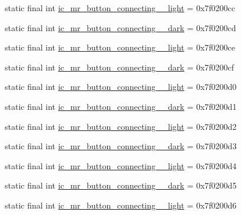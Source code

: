 \begin{CompactItemize}
\item 
static final int \hyperlink{classandroid_1_1support_1_1graphics_1_1drawable_1_1animated_1_1_r_1_1drawable_4007dc5f6162a5acce25eed9bab233d5}{ic\_\-mr\_\-button\_\-connecting\_\_\-light} = 0x7f0200cc
\item 
static final int \hyperlink{classandroid_1_1support_1_1graphics_1_1drawable_1_1animated_1_1_r_1_1drawable_16026dc935c996a94e7cd1c3d186f9f5}{ic\_\-mr\_\-button\_\-connecting\_\_\-dark} = 0x7f0200cd
\item 
static final int \hyperlink{classandroid_1_1support_1_1graphics_1_1drawable_1_1animated_1_1_r_1_1drawable_51d6776d69bb6c65dd52cec5afc11d7f}{ic\_\-mr\_\-button\_\-connecting\_\_\-light} = 0x7f0200ce
\item 
static final int \hyperlink{classandroid_1_1support_1_1graphics_1_1drawable_1_1animated_1_1_r_1_1drawable_f55a3f2fc453abaecc8fd0350d42699d}{ic\_\-mr\_\-button\_\-connecting\_\_\-dark} = 0x7f0200cf
\item 
static final int \hyperlink{classandroid_1_1support_1_1graphics_1_1drawable_1_1animated_1_1_r_1_1drawable_a18497a04d33b9124e3905023b31c2c5}{ic\_\-mr\_\-button\_\-connecting\_\_\-light} = 0x7f0200d0
\item 
static final int \hyperlink{classandroid_1_1support_1_1graphics_1_1drawable_1_1animated_1_1_r_1_1drawable_fba04b483ae1a3d226733e5d880ed49a}{ic\_\-mr\_\-button\_\-connecting\_\_\-dark} = 0x7f0200d1
\item 
static final int \hyperlink{classandroid_1_1support_1_1graphics_1_1drawable_1_1animated_1_1_r_1_1drawable_a42793b152ceb40904e4164e52fa7ada}{ic\_\-mr\_\-button\_\-connecting\_\_\-light} = 0x7f0200d2
\item 
static final int \hyperlink{classandroid_1_1support_1_1graphics_1_1drawable_1_1animated_1_1_r_1_1drawable_e7a690963cd0cafa19c0f453ffb140a2}{ic\_\-mr\_\-button\_\-connecting\_\_\-dark} = 0x7f0200d3
\item 
static final int \hyperlink{classandroid_1_1support_1_1graphics_1_1drawable_1_1animated_1_1_r_1_1drawable_5885527be325d5dad39b5091240e2eee}{ic\_\-mr\_\-button\_\-connecting\_\_\-light} = 0x7f0200d4
\item 
static final int \hyperlink{classandroid_1_1support_1_1graphics_1_1drawable_1_1animated_1_1_r_1_1drawable_2c7d416d558d9b454a14516482930dff}{ic\_\-mr\_\-button\_\-connecting\_\_\-dark} = 0x7f0200d5
\item 
static final int \hyperlink{classandroid_1_1support_1_1graphics_1_1drawable_1_1animated_1_1_r_1_1drawable_212cf86787d93ebeb1f822dca57da0c9}{ic\_\-mr\_\-button\_\-connecting\_\_\-light} = 0x7f0200d6

\end{CompactItemize}

